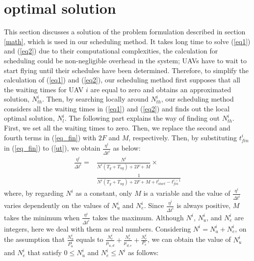 \documentclass{ieeeaccess}
\begin{document}
\appendices
\section{optimal solution}\label{ape}
This section discusses a solution of the problem formulation described in section \ref{math}, which is used in our scheduling method.
%
It takes long time to solve (\ref{eq1}) and (\ref{eq2}) due to their computational complexities, the calculation for scheduling could be non-negligible overhead in the system; UAVs have to wait to start flying until their schedules have been determined.
%
%
Therefore, to simplify the calculation of (\ref{eq1}) and (\ref{eq2}), our scheduling method first supposes that all the waiting times for UAV $i$ are equal to zero and obtains an approximated solution, $N_{th}^i$.
Then, by searching locally around $N_{th}^i$, our scheduling method considers all the waiting times in (\ref{eq1}) and (\ref{eq2}) and finds out the local optimal solution, $N_{l}^i$.
The following part explains the way of finding out $N_{th}^i$.
%
First, we set all the waiting times to zero.
%
Then, we replace the second and fourth terms in (\ref{eq_fin}) with $2F$ and $M$, respectively.
%
Then, by substituting ${t_{fin}^i}$ in (\ref{eq_fin}) to (\ref{ut}), we obtain $\frac{\eta^i}{{\Delta{t}}^i}$ as below:
%
\begin{align}
\frac{\eta^{i}}{{\Delta{t}}^i}
=&\frac{N^i}{N^i({T_g}+T_{ng})+2F+M}\times\nonumber\\
&\frac{1}{N^i({T_g}+T_{ng})+2F+M+t_{start}^i-t_{fin}^{i-1}}\label{eq4}
\end{align}
%
where, by regarding $N^i$ as a constant, only $M$ is a variable and the value of $\frac{\eta^{i}}{{\Delta{t}}^i}$ varies dependently on the values of $N_u^i$ and $N_e^i$.
%
Since $\frac{\eta^{i}}{{\Delta{t}}^i}$ is always positive,  $M$ takes the minimum when $\frac{\eta^{i}}{{\Delta{t}}^i}$ takes the maximum. 
%
Although $N^i$, $N_u^i$, and $N_e^i$ are integers, here we deal with them as real numbers.
%
Considering $N^i=N_u^i + N_e^i$, on the assumption that $\frac{N_u^i}{P_u^i}$ equals to $\frac{N_e^i}{\mu_{u,d}}+\frac{N_e^i}{\mu_{d,e}}+\frac{N_e^i}{P_e}$, we can obtain the value of $N_u^i$ and $N_e^i$ that satisfy $0\leq{N_u^i}$ and ${N_e^i}\leq{N^i}$ as follows:
\end{document}
